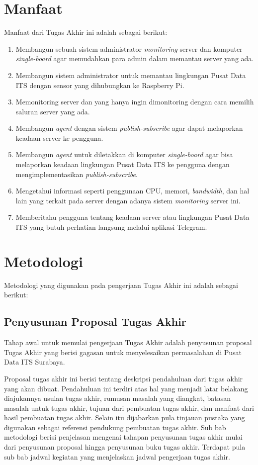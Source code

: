 \section{Manfaat}
Manfaat dari Tugas Akhir ini adalah sebagai berikut:

\begin{enumerate}
	\item Membangun sebuah sistem administrator \textit{monitoring} server dan komputer \textit{single-board} agar memudahkan para admin dalam memantau server yang ada.
	\item Membangun sistem administrator untuk memantau lingkungan Pusat Data ITS dengan sensor yang dihubungkan ke Raspberry Pi.
	\item Memonitoring server dan yang hanya ingin dimonitoring dengan cara memilih saluran server yang ada.
	\item Membangun \textit{agent} dengan sistem \textit{publish-subscribe} agar dapat melaporkan keadaan server ke pengguna.
	\item Membangun \textit{agent} untuk diletakkan di komputer \textit{single-board} agar bisa melaporkan keadaan lingkungan Pusat Data ITS ke pengguna dengan mengimplementasikan \textit{publish-subscribe}.
	\item Mengetahui informasi seperti penggunaan CPU, memori, \textit{bandwidth}, dan hal lain yang terkait pada server dengan adanya sistem \textit{monitoring} server ini.
	\item Memberitahu pengguna tentang keadaan server atau lingkungan Pusat Data ITS yang butuh perhatian langsung melalui aplikasi Telegram.
\end{enumerate}

\section{Metodologi}
Metodologi yang digunakan pada pengerjaan Tugas Akhir ini
adalah sebagai berikut:
\subsection{Penyusunan Proposal Tugas Akhir}
Tahap awal untuk memulai pengerjaan Tugas Akhir adalah penyusunan proposal Tugas Akhir yang berisi gagasan untuk menyelesaikan permasalahan di Pusat Data ITS Surabaya.

Proposal tugas akhir ini berisi tentang deskripsi pendahuluan dari tugas akhir yang akan dibuat. Pendahuluan ini terdiri atas hal yang menjadi latar belakang diajukannya usulan tugas akhir, rumusan masalah yang diangkat, batasan masalah untuk tugas akhir, tujuan dari pembuatan tugas akhir, dan manfaat dari hasil pembuatan tugas akhir. Selain itu dijabarkan pula tinjauan pustaka yang digunakan sebagai referensi pendukung pembuatan tugas akhir. Sub bab metodologi berisi penjelasan mengenai tahapan penyusunan tugas akhir mulai dari penyusunan proposal hingga penyusunan buku tugas akhir. Terdapat pula sub bab jadwal kegiatan yang menjelaskan jadwal pengerjaan tugas akhir.
